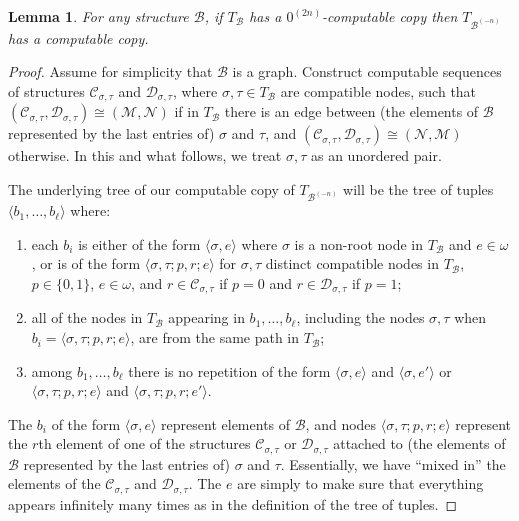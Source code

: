 \documentclass[10pt,a4paper]{article}
\newcommand{\Inv}[2]{{#2}^{(-#1)}}
\newtheorem{lem}[thm]{Lemma}
\theoremstyle{definition}
\begin{document}
	\begin{lem}
		For any structure $\mathcal{B}$, if $T_{\mathcal{B}}$ has a $0^{(2n)}$-computable copy then $T_{\Inv{n}{\mathcal{B}}}$ has a computable copy.
	\end{lem}
	\begin{proof}
		Assume for simplicity that $\mathcal{B}$ is a graph. Construct computable sequences of structures $\mathcal{C}_{\sigma,\tau}$ and $\mathcal{D}_{\sigma,\tau}$, where $\sigma, \tau \in T_{\mathcal{B}}$ are compatible nodes, such that $(\mathcal{C}_{\sigma,\tau},\mathcal{D}_{\sigma,\tau}) \cong (\mathcal{M},\mathcal{N})$ if in $T_{\mathcal{B}}$ there is an edge between (the elements of $\mathcal{B}$ represented by the last entries of) $\sigma$ and $\tau$, and $(\mathcal{C}_{\sigma,\tau},\mathcal{D}_{\sigma,\tau}) \cong (\mathcal{N},\mathcal{M})$ otherwise. In this and what follows, we treat $\sigma,\tau$ as an unordered pair.
		
		The underlying tree of our computable copy of $T_{\Inv{n}{\mathcal{B}}}$ will be the tree of tuples $\langle b_1,\ldots,b_\ell \rangle$ where:
		\begin{enumerate}
			\item each $b_i$ is either of the form $\langle \sigma,e \rangle$ where $\sigma$ is a non-root node in $T_{\mathcal{B}}$ and $e \in \omega$, or is of the form $\langle \sigma,\tau; p, r ; e \rangle$ for $\sigma,\tau$ distinct compatible nodes in $T_{\mathcal{B}}$, $p \in \{0,1\}$, $e \in \omega$, and $r \in \mathcal{C}_{\sigma,\tau}$ if $p = 0$ and $r \in \mathcal{D}_{\sigma,\tau}$ if $p = 1$;
			\item all of the nodes in $T_{\mathcal{B}}$ appearing in $b_1,\ldots,b_\ell$, including the nodes $\sigma,\tau$ when $b_i = \langle \sigma,\tau; p, r ; e \rangle$, are from the same path in $T_{\mathcal{B}}$;
			\item among $b_1,\ldots,b_\ell$ there is no repetition of the form $\langle \sigma,e \rangle$ and $\langle \sigma,e' \rangle$ or $\langle \sigma,\tau; p, r ; e \rangle$ and $\langle \sigma,\tau; p, r ; e' \rangle$.
		\end{enumerate}
		The $b_i$ of the form $\langle \sigma,e \rangle$ represent elements of $\mathcal{B}$, and nodes $\langle \sigma,\tau; p, r ; e \rangle$ represent the $r$th element of one of the structures $\mathcal{C}_{\sigma,\tau}$ or $\mathcal{D}_{\sigma,\tau}$ attached to (the elements of $\mathcal{B}$ represented by the last entries of) $\sigma$ and $\tau$. Essentially, we have ``mixed in'' the elements of the $\mathcal{C}_{\sigma,\tau}$ and $\mathcal{D}_{\sigma,\tau}$. The $e$ are simply to make sure that everything appears infinitely many times as in the definition of the tree of tuples.
		

\end{proof}
\end{document}
